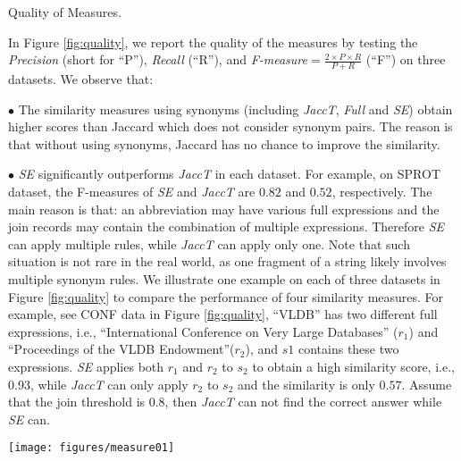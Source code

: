 Quality of Measures.

In Figure \ref{fig:quality}, we report the quality of the measures by testing the \textit{Precision} (short for ``P''),  \textit{Recall} (``R''), and \textit{F-measure$=\frac{2\times P \times R}{P+R}$} (``F'') on three datasets. We observe that:

\noindent$\bullet$ The similarity measures using synonyms (including \textit{JaccT}, \textit{Full} and \textit{SE}) obtain higher scores than Jaccard which does not consider synonym pairs. The reason is that without using synonyms, Jaccard has no chance to improve the similarity.



\noindent$\bullet$ \textit{SE} significantly outperforms \textit{JaccT} in each dataset. For example, on SPROT dataset, the F-measures of \textit{SE} and \textit{JaccT} are $0.82$ and $0.52$, respectively. The main reason is that: an abbreviation may have various full expressions and the join records may contain the combination of multiple expressions. Therefore \textit{SE} can apply multiple rules, while \textit{JaccT} can apply only one. Note that such situation is not rare in the real world, as one fragment of a string likely involves multiple synonym rules. We illustrate one example on each of three datasets in Figure \ref{fig:quality} to compare the performance of four similarity measures. For example, see CONF data in Figure \ref{fig:quality}, ``\textsf{VLDB}'' has two different full expressions, i.e., ``\textsf{International Conference on Very Large Databases}'' ($r_1$) and ``\textsf{Proceedings of the VLDB Endowment}''($r_2$), and $s1$ contains these two expressions.  \textit{SE} applies both $r_1$ and $r_2$ to $s_2$ to obtain a high similarity score, i.e., 0.93, while \textit{JaccT} can only apply $r_2$ to $s_2$ and the similarity is only $0.57$. Assume that the join threshold is 0.8, then  \textit{JaccT} can not find the correct answer while \textit{SE} can.


\begin{figure*}[h]
	\small
	\centering
	\texttt{[image: figures/measure01]}
	\caption{Quality of similarity measures (P: precision, R: recall, F: F-measure) and examples to illustrate the quality of similarity measures. }
	\label{fig:quality}
\end{figure*}

